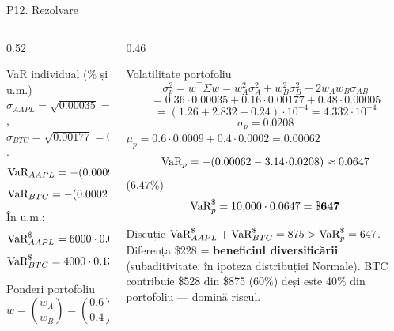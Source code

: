 \documentclass[9pt, aspectratio=169, t]{beamer}
\begin{document}
\begin{frame}[shrink=22]{P12. Rezolvare}
\begin{columns}[T]
\begin{column}{0.52\textwidth}
\begin{block}{VaR individual (\% și u.m.)}
$\sigma_{AAPL}=\sqrt{0.00035}=0.0187$, $\sigma_{BTC}=\sqrt{0.00177}=0.0421$.
\[
\text{VaR}_{AAPL} = -(0.0009 -3.14\cdot 0.0187) = 0.0578\to 5.78\%
\]
\[
\text{VaR}_{BTC} = -(0.0002 - 3.14\cdot 0.0421) = 0.1320\to 13.20\%
\]
În u.m.:
\[
\text{VaR}_{AAPL}^\$ = 6000\cdot 0.0578 = \mathbf{\$347}
\]
\[
\text{VaR}_{BTC}^\$ = 4000\cdot 0.1320 = \mathbf{\$528}
\]
\end{block}
\begin{block}{Ponderi portofoliu}
\[
w = \binom{w_A}{w_B} = \binom{0.6}{0.4}
\]
\end{block}
\end{column}
\begin{column}{0.46\textwidth}
\begin{block}{Volatilitate portofoliu}
\[
\sigma_p^2 = w^\top\Sigma w = w_A^2\sigma_A^2 + w_B^2\sigma_B^2 + 2w_Aw_B\sigma_{AB}
\]
\[
= 0.36\!\cdot\!0.00035 + 0.16\!\cdot\!0.00177 + 0.48\!\cdot\!0.00005
\]
\[
= (1.26 + 2.832 + 0.24)\!\cdot\!10^{-4} = 4.332\!\cdot\!10^{-4}
\]
\[
\sigma_p = 0.0208
\]
$\mu_p = 0.6\cdot 0.0009 + 0.4\cdot 0.0002 = 0.00062$
\[
\text{VaR}_p = -(0.00062 - 3.14\!\cdot\!0.0208) \approx 0.0647
\]
\quad ($6.47\%$)
\[
\text{VaR}_p^\$ = 10{,}000\cdot 0.0647 = \mathbf{\$647}
\]
\end{block}
\begin{alertblock}{Discuție}
$\text{VaR}_{AAPL}^\$ + \text{VaR}_{BTC}^\$ = 875 > \text{VaR}_p^\$=647$. Diferența \$228 = \textbf{beneficiul diversificării} (subaditivitate, în ipoteza distribuției Normale). BTC contribuie \$528 din \$875 (60\%) deși este 40\% din portofoliu --- domină riscul.
\end{alertblock}
\end{column}
\end{columns}
\end{frame}
\end{document}
